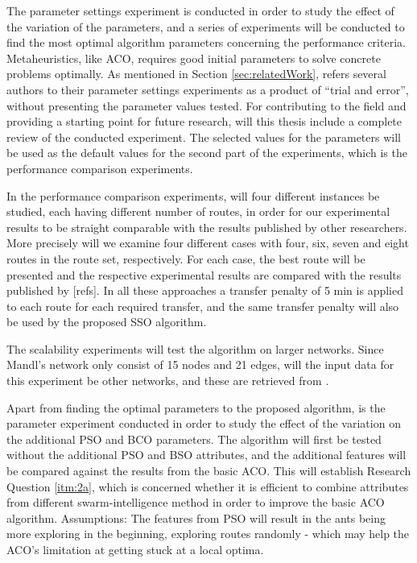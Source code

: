 The parameter settings experiment is conducted in order to study the effect of the variation of the parameters, and a series of experiments will be conducted to find the most optimal algorithm parameters concerning the performance criteria. Metaheuristics, like ACO, requires good initial parameters to solve concrete problems optimally. As mentioned in Section \vref{sec:relatedWork}, refers several authors to their parameter settings experiments as a product of ``trial and error'', without presenting the parameter values tested. For contributing to the field and providing a starting point for future research, will this thesis include a complete review of the conducted experiment. The selected values for the parameters will be used as the default values for the second part of the experiments, which is the performance comparison experiments.

In the performance comparison experiments, will four different instances be studied, each having different number of routes, in order for our experimental results to be straight comparable with the results published by other researchers. More precisely will we examine four different cases with four, six, seven and eight routes in the route set, respectively. For each case, the best route will be presented and the respective experimental results are compared with the results published by [refs]. In all these approaches a transfer penalty of 5 min is applied to each route for each required transfer, and the same transfer penalty will also be used by the proposed SSO algorithm. 

The scalability experiments will test the algorithm on larger networks. Since Mandl's network only consist of 15 nodes and 21 edges, will the input data for this experiment be other networks, and these are retrieved from \citet{mumford13}. %

Apart from finding the optimal parameters to the proposed algorithm, is the parameter experiment conducted in order to study the effect of the variation on the additional PSO and BCO parameters. The algorithm will first be tested without the additional PSO and BSO attributes, and the additional features will be compared against the results from the basic ACO. This will establish Research Question \vref{itm:2a}, which is concerned whether it is efficient to combine attributes from different swarm-intelligence method in order to improve the basic ACO algorithm. Assumptions: The features from PSO will result in the ants being more exploring in the beginning, exploring routes randomly - which may help the ACO's limitation at getting stuck at a local optima. 

